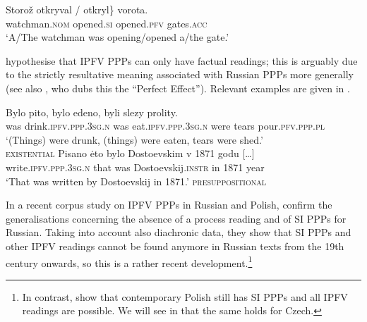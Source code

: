 \documentclass[output=paper,colorlinks,citecolor=brown]{langscibook}
\begin{document}
\ea 
\label{ex:storozppp}
\gll Storož \minsp{\{} otkryval / otkryl\} vorota.   \\
	watchman.\textsc{nom} {} opened.\textsc{si} {} opened.\textsc{pfv} gates.\textsc{acc}\\
\glt	`A/The watchman was opening/opened a/the gate.'
\z 
\z 

\noindent \citeauthor{Borik.Gehrke2018} hypothesise that IPFV PPPs can only have factual readings; this is arguably due to the strictly resultative meaning associated with Russian PPPs more generally (see also \citealt{Schoorlemmer1995}, who dubs this the ``Perfect Effect''). Relevant examples are given in  \citep[from][58 \& 60]{Borik.Gehrke2018}.

\ea\label{pisano}
\ea
\gll Bylo pito, bylo edeno, byli slezy prolity. \label{pito}\\
	was drink.\textsc{ipfv.ppp.3sg.n} was eat.\textsc{ipfv.ppp.3sg.n} were tears pour.\textsc{pfv.ppp.pl}\\
\glt	`(Things) were drunk, (things) were eaten, tears were shed.' \\{} \hfill \textsc{existential}
\ex
\gll Pisano ėto bylo Dostoevskim v 1871 godu [\dots]\\ 
	write.\textsc{ipfv.ppp.3sg.n} that was Dostoevskij.\textsc{instr} in 1871 year \\
\glt	`That was written by Dostoevskij in 1871.'\label{pisanodost} \hfill \textsc{presuppositional}
\z 
\z 

\noindent In a recent corpus study on IPFV PPPs in Russian and Polish, \citet{wiemer+23} confirm the generalisations concerning the absence of a process reading and of SI PPPs for Russian. Taking into account also diachronic data, they show that SI PPPs and other IPFV readings cannot be found anymore in Russian texts from the 19th century onwards, so this is a rather recent development.\footnote{In contrast, \citet{wiemer+23} show that contemporary Polish still has SI PPPs and all IPFV readings are possible. We will see in  that the same holds for Czech.}
\end{document}

